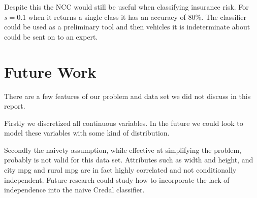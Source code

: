 Despite this the NCC would still be useful when classifying insurance risk.
For $s=0.1$ when it returns a single class it has an accuracy of 80\%.
The classifier could be used as a preliminary tool and then vehicles it is indeterminate about could be sent on to an expert.

\section{Future Work}

There are a few features of our problem and data set we did not discuss in this report.

Firstly we discretized all continuous variables.
In the future we could look to model these variables with some kind of distribution.

Secondly the naivety assumption, while effective at simplifying the problem, probably is not valid for this data set.
Attributes such as width and height, and city mpg and rural mpg are in fact highly correlated and not conditionally independent.
Future research could study how to incorporate the lack of independence into the naive Credal classifier.